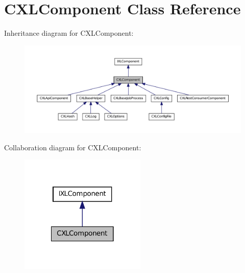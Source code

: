 \hypertarget{classCXLComponent}{
\section{CXLComponent Class Reference}
\label{classCXLComponent}
}


Inheritance diagram for CXLComponent:\nopagebreak
\begin{figure}[H]
\begin{center}
\leavevmode
\includegraphics[width=400pt]{classCXLComponent__inherit__graph}
\end{center}
\end{figure}


Collaboration diagram for CXLComponent:\nopagebreak
\begin{figure}[H]
\begin{center}
\leavevmode
\includegraphics[width=170pt]{classCXLComponent__coll__graph}
\end{center}
\end{figure}
